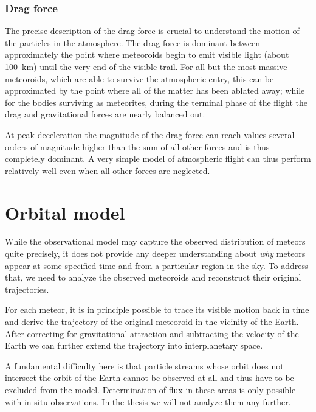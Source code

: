         \subsubsection{Drag force} \label{said}
            The precise description of the drag force is crucial to understand the motion
            of the particles in the atmosphere. The drag force is dominant between approximately
            the point where meteoroids begin to emit visible light (about \SI{100}{\kilo\metre})
            until the very end of the visible trail. For all but the most massive meteoroids,
            which are able to survive the atmospheric entry, this can be approximated
            by the point where all of the matter has been ablated away; while for the bodies
            surviving as meteorites, during the terminal phase of the flight the drag and
            gravitational forces are nearly balanced out.

            At peak deceleration the magnitude of the drag force can reach values several orders of magnitude
            higher than the sum of all other forces and is thus completely dominant.
            A very simple model of atmospheric flight can thus perform relatively
            well even when all other forces are neglected.

    \subsection{}

\section{Orbital model} \label{mo}
    While the observational model may capture the observed distribution of meteors quite precisely,
    it does not provide any deeper understanding about \textit{why} meteors appear
    at some specified time and from a particular region in the sky.
    To address that, we need to analyze the observed meteoroids and reconstruct their original trajectories.

    For each meteor, it is in principle possible to trace its visible motion back in time
    and derive the trajectory of the original meteoroid in the vicinity of the Earth.
    After correcting for gravitational attraction and subtracting the velocity of the Earth
    we can further extend the trajectory into interplanetary space.

    A fundamental difficulty here is that particle streams whose orbit does not intersect
    the orbit of the Earth cannot be observed at all and thus have to be excluded from the model.
    Determination of flux in these areas is only possible with in situ observations.
    In the thesis we will not analyze them any further.


